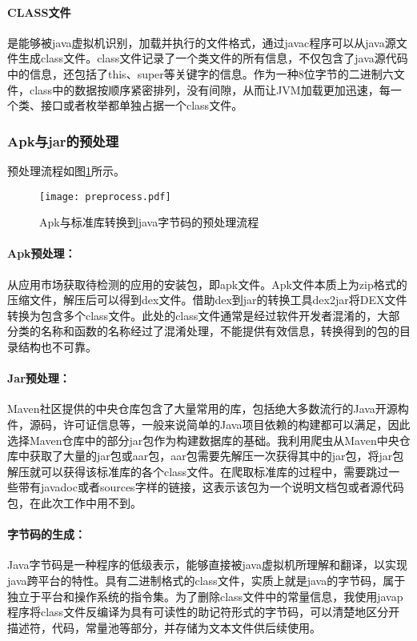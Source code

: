 \paragraph{CLASS文件}是能够被java虚拟机识别，加载并执行的文件格式，通过javac程序可以从java源文件生成class文件。class文件记录了一个类文件的所有信息，不仅包含了java源代码中的信息，还包括了this、super等关键字的信息。作为一种8位字节的二进制六文件，class中的数据按顺序紧密排列，没有间隙，从而让JVM加载更加迅速，每一个类、接口或者枚举都单独占据一个class文件。


\subsubsection{Apk与jar的预处理}

预处理流程如图\ref{fig:preprocess}所示。
\begin{figure}[!htp]
  \centering
  \texttt{[image: preprocess.pdf]} \\
  \caption{Apk与标准库转换到java字节码的预处理流程}
 \label{fig:preprocess}
\end{figure}

\paragraph{Apk预处理：}从应用市场获取待检测的应用的安装包，即apk文件。Apk文件本质上为zip格式的压缩文件，解压后可以得到dex文件。借助dex到jar的转换工具dex2jar\cite{d2j}将DEX文件转换为包含多个class文件。此处的class文件通常是经过软件开发者混淆的，大部分类的名称和函数的名称经过了混淆处理，不能提供有效信息，转换得到的包的目录结构也不可靠。


\paragraph{Jar预处理：}Maven社区提供的中央仓库\cite{maven}包含了大量常用的库，包括绝大多数流行的Java开源构件，源码，许可证信息等，一般来说简单的Java项目依赖的构建都可以满足，因此选择Maven仓库中的部分jar包作为构建数据库的基础。我利用爬虫从Maven中央仓库中获取了大量的jar包或aar包，aar包需要先解压一次获得其中的jar包，将jar包解压就可以获得该标准库的各个class文件。在爬取标准库的过程中，需要跳过一些带有javadoc或者sources字样的链接，这表示该包为一个说明文档包或者源代码包，在此次工作中用不到。


\paragraph{字节码的生成：}Java字节码是一种程序的低级表示，能够直接被java虚拟机所理解和翻译，以实现java跨平台的特性。具有二进制格式的class文件，实质上就是java的字节码，属于独立于平台和操作系统的指令集。为了删除class文件中的常量信息，我使用javap程序将class文件反编译为具有可读性的助记符形式的字节码，可以清楚地区分开描述符，代码，常量池等部分，并存储为文本文件供后续使用。




